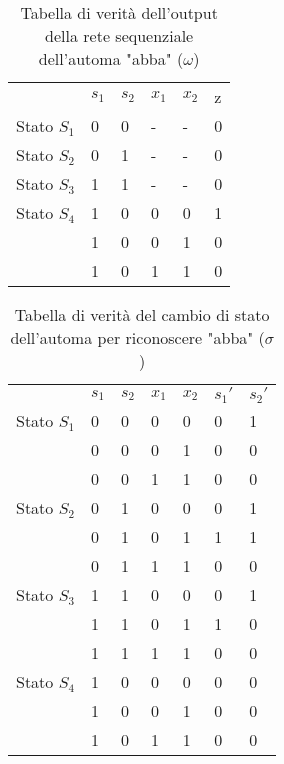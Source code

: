 \begin{table}[H]
	\centering
	\caption{Tabella di verità dell'output della rete sequenziale dell'automa "abba" ($ \omega $)}
	\label{tab:mealyomega2}
	\begin{tabular}{l|llll|l|}
		\cline{2-6}
		& $s_1$ & $s_2$ & $x_1$ & $x_2$ & z \\ \cline{2-6} 
		Stato $S_1$ & 0     & 0     & -     & -     & 0 \\
		Stato $S_2$ & 0     & 1     & -     & -     & 0 \\
		Stato $S_3$ & 1     & 1     & -     & -     & 0 \\
		Stato $S_4$ & 1     & 0     & 0     & 0     & 1 \\
		& 1     & 0     & 0     & 1     & 0 \\
		& 1     & 0     & 1     & 1     & 0 \\ \cline{2-6} 
	\end{tabular}
\end{table}

\begin{table}[H]
	\centering
	\caption{Tabella di verità del cambio di stato dell'automa per riconoscere "abba" ($\sigma$)}
	\label{tab:mealysigma2}
	\begin{tabular}{l|llll|ll|}
		\cline{2-7}
		& $s_1$ & $s_2$ & $x_1$ & $x_2$ & $s_1'$ & $s_2'$ \\ \cline{2-7} 
		Stato $S_1$ & 0     & 0     & 0     & 0     & 0      & 1      \\
		& 0     & 0     & 0     & 1     & 0      & 0      \\
		& 0     & 0     & 1     & 1     & 0      & 0      \\ \cline{2-7} 
		Stato $S_2$ & 0     & 1     & 0     & 0     & 0      & 1      \\
		& 0     & 1     & 0     & 1     & 1      & 1      \\
		& 0     & 1     & 1     & 1     & 0      & 0      \\ \cline{2-7} 
		Stato $S_3$ & 1     & 1     & 0     & 0     & 0      & 1      \\
		& 1     & 1     & 0     & 1     & 1      & 0      \\
		& 1     & 1     & 1     & 1     & 0      & 0      \\ \cline{2-7} 
		Stato $S_4$ & 1     & 0     & 0     & 0     & 0      & 0      \\
		& 1     & 0     & 0     & 1     & 0      & 0      \\
		& 1     & 0     & 1     & 1     & 0      & 0      \\ \cline{2-7} 
	\end{tabular}
\end{table}

